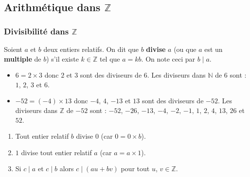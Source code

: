 





  \subsection{Arithmétique dans \texorpdfstring{$\mathbb{Z}$}{Z}}

  \subsubsection{Divisibilité dans \texorpdfstring{$\mathbb{Z}$}{Z}}

  \begin{definition}
    Soient $a$ et $b$ deux entiers relatifs. On dit que $b$ \textbf{divise} $a$ (ou que $a$ est un \textbf{multiple} de $b$) s'il existe $k \in \mathbb{Z}$ tel que $a = kb$. On note ceci par $b \mid a$.
  \end{definition}

  \begin{example}
    \begin{itemize}
      \item $6 = 2 \times 3$ donc $2$ et $3$ sont des diviseurs de $6$.
      Les diviseurs dans $\mathbb{N}$ de $6$ sont : $1$, $2$, $3$ et $6$.
      \item $-52 = (-4) \times 13$ donc $-4$, $4$, $-13$ et $13$ sont des diviseurs de $-52$. Les diviseurs dans $\mathbb{Z}$ de $-52$ sont : $-52$, $-26$, $-13$, $-4$, $-2$, $-1$, $1$, $2$, $4$, $13$, $26$ et $52$.
    \end{itemize}
  \end{example}

  \begin{proposition}
    \begin{enumerate}[label={\bfseries(\roman*)}]
      \item Tout entier relatif $b$ divise $0$ (car $0 = 0 \times b$).
      \item $1$ divise tout entier relatif $a$ (car $a = a \times 1$).
      \item Si $c \mid a$ et $c \mid b$ alors $c \mid (au + bv)$ pour tout $u$, $v \in \mathbb{Z}$.
    \end{enumerate}
  \end{proposition}

